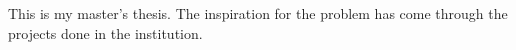 \documentclass[class=article, crop=false]{standalone}
\begin{document}
This is my master's thesis. The inspiration for the problem has come through the projects done in the institution. 
\end{document}
